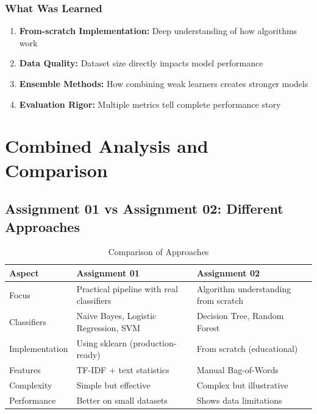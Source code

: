 \documentclass[14pt,a4paper]{report}
\begin{document}
\subsection{What Was Learned}

\begin{enumerate}
    \item \textbf{From-scratch Implementation:} Deep understanding of how algorithms work
    \item \textbf{Data Quality:} Dataset size directly impacts model performance
    \item \textbf{Ensemble Methods:} How combining weak learners creates stronger models
    \item \textbf{Evaluation Rigor:} Multiple metrics tell complete performance story
\end{enumerate}

\newpage

\chapter{Combined Analysis and Comparison}

\section{Assignment 01 vs Assignment 02: Different Approaches}

\begin{table}[H]
\centering
\caption{Comparison of Approaches}
\begin{tabular}{|l|p{4cm}|p{4cm}|}
\hline
\textbf{Aspect} & \textbf{Assignment 01} & \textbf{Assignment 02} \\
\hline
Focus & Practical pipeline with real classifiers & Algorithm understanding from scratch \\
\hline
Classifiers & Naive Bayes, Logistic Regression, SVM & Decision Tree, Random Forest \\
\hline
Implementation & Using sklearn (production-ready) & From scratch (educational) \\
\hline
Features & TF-IDF + text statistics & Manual Bag-of-Words \\
\hline
Complexity & Simple but effective & Complex but illustrative \\
\hline
Performance & Better on small datasets & Shows data limitations \\
\hline
\end{tabular}
\end{table}
\end{document}

